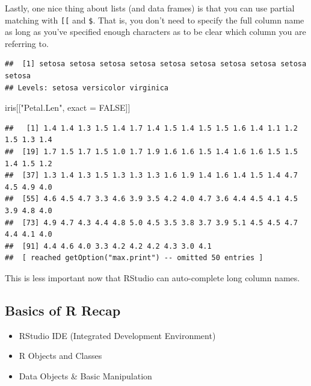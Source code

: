 \documentclass[
]{book}
\newenvironment{Shaded}{\begin{snugshade}}{\end{snugshade}}
\newcommand{\DecValTok}[1]{\textcolor[rgb]{0.00,0.00,0.81}{#1}}
\newcommand{\NormalTok}[1]{#1}
\newcommand{\OperatorTok}[1]{\textcolor[rgb]{0.81,0.36,0.00}{\textbf{#1}}}
\newcommand{\OtherTok}[1]{\textcolor[rgb]{0.56,0.35,0.01}{#1}}
\newcommand{\StringTok}[1]{\textcolor[rgb]{0.31,0.60,0.02}{#1}}
\theoremstyle{definition}
\theoremstyle{definition}
\theoremstyle{definition}
\theoremstyle{remark}
\begin{document}
Lastly, one nice thing about lists (and data frames) is that you can use partial matching with \texttt{{[}{[}} and \texttt{\$}. That is, you don't need to specify the full column name as long as you've specified enough characters as to be clear which column you are referring to.

\begin{Shaded}
\end{Shaded}

\begin{verbatim}
##  [1] setosa setosa setosa setosa setosa setosa setosa setosa setosa setosa
## Levels: setosa versicolor virginica
\end{verbatim}

\begin{Shaded}
\begin{Highlighting}[]
\NormalTok{iris[[}\StringTok{"Petal.Len"}\NormalTok{, exact =}\StringTok{ }\OtherTok{FALSE}\NormalTok{]]}
\end{Highlighting}
\end{Shaded}

\begin{verbatim}
##   [1] 1.4 1.4 1.3 1.5 1.4 1.7 1.4 1.5 1.4 1.5 1.5 1.6 1.4 1.1 1.2 1.5 1.3 1.4
##  [19] 1.7 1.5 1.7 1.5 1.0 1.7 1.9 1.6 1.6 1.5 1.4 1.6 1.6 1.5 1.5 1.4 1.5 1.2
##  [37] 1.3 1.4 1.3 1.5 1.3 1.3 1.3 1.6 1.9 1.4 1.6 1.4 1.5 1.4 4.7 4.5 4.9 4.0
##  [55] 4.6 4.5 4.7 3.3 4.6 3.9 3.5 4.2 4.0 4.7 3.6 4.4 4.5 4.1 4.5 3.9 4.8 4.0
##  [73] 4.9 4.7 4.3 4.4 4.8 5.0 4.5 3.5 3.8 3.7 3.9 5.1 4.5 4.5 4.7 4.4 4.1 4.0
##  [91] 4.4 4.6 4.0 3.3 4.2 4.2 4.2 4.3 3.0 4.1
##  [ reached getOption("max.print") -- omitted 50 entries ]
\end{verbatim}

This is less important now that RStudio can auto-complete long column names.

\hypertarget{basics-of-r-recap}{%
\subsection{Basics of R Recap}\label{basics-of-r-recap}}

\begin{itemize}
\item
  RStudio IDE (Integrated Development Environment)
\item
  R Objects and Classes
\item
  Data Objects \& Basic Manipulation
\end{itemize}
\end{document}
